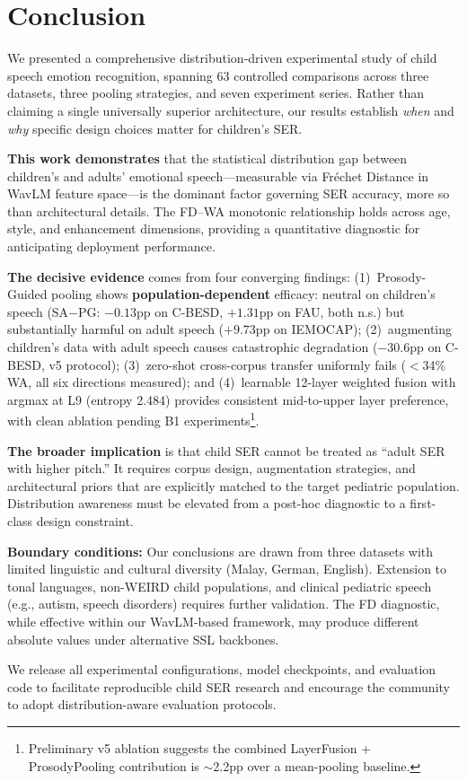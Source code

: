 
\section{Conclusion}
\label{sec:conclusion}

We presented a comprehensive distribution-driven experimental study of child
speech emotion recognition, spanning 63 controlled comparisons across three
datasets, three pooling strategies, and seven experiment series. Rather than
claiming a single universally superior architecture, our results establish
\textit{when} and \textit{why} specific design choices matter for children's
SER.

\textbf{This work demonstrates} that the statistical distribution gap between
children's and adults' emotional speech---measurable via Fr\'{e}chet Distance
in WavLM feature space---is the dominant factor governing SER accuracy, more
so than architectural details. The FD--WA monotonic relationship holds across
age, style, and enhancement dimensions, providing a quantitative diagnostic for
anticipating deployment performance.

\textbf{The decisive evidence} comes from four converging findings:
(1)~Prosody-Guided pooling shows \textbf{population-dependent} efficacy: neutral
on children's speech (SA$-$PG: $-0.13$pp on C-BESD, $+1.31$pp on FAU, both
n.s.) but substantially harmful on adult speech ($+9.73$pp on IEMOCAP);
(2)~augmenting children's data with adult speech causes catastrophic degradation
($-30.6$pp on C-BESD, v5 protocol);
(3)~zero-shot cross-corpus transfer uniformly fails ($<$34\% WA, all six
directions measured); and
(4)~learnable 12-layer weighted fusion with argmax at L9 (entropy 2.484) provides
consistent mid-to-upper layer preference, with clean ablation pending B1
experiments\footnote{Preliminary v5 ablation suggests the combined LayerFusion +
ProsodyPooling contribution is $\sim$2.2pp over a mean-pooling baseline.}.

\textbf{The broader implication} is that child SER cannot be treated as
``adult SER with higher pitch.'' It requires corpus design, augmentation
strategies, and architectural priors that are explicitly matched to the target
pediatric population. Distribution awareness must be elevated from a
post-hoc diagnostic to a first-class design constraint.

\textbf{Boundary conditions:} Our conclusions are drawn from three datasets
with limited linguistic and cultural diversity (Malay, German, English).
Extension to tonal languages, non-WEIRD child populations, and clinical
pediatric speech (e.g., autism, speech disorders) requires further validation.
The FD diagnostic, while effective within our WavLM-based framework, may
produce different absolute values under alternative SSL backbones.

We release all experimental configurations, model checkpoints, and evaluation
code to facilitate reproducible child SER research and encourage the community
to adopt distribution-aware evaluation protocols.
